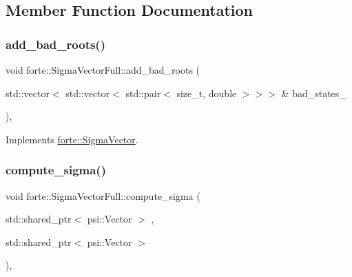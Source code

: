 \subsection{Member Function Documentation}
\mbox{\label{classforte_1_1_sigma_vector_full_a231cdb205bf558b4270daae212bd9dc6}} 
\subsubsection{\texorpdfstring{add\+\_\+bad\+\_\+roots()}{add\_bad\_roots()}}
{\footnotesize\ttfamily void forte\+::\+Sigma\+Vector\+Full\+::add\+\_\+bad\+\_\+roots (\begin{DoxyParamCaption}\item[{std\+::vector$<$ std\+::vector$<$ std\+::pair$<$ size\+\_\+t, double $>$$>$$>$ \&}]{bad\+\_\+states\+\_\+ }\end{DoxyParamCaption})\hspace{0.3cm}{\ttfamily [override]}, {\ttfamily [virtual]}}



Implements \mbox{\hyperlink{classforte_1_1_sigma_vector_a5cd950852f515bc082ca1df31bd84e3e}{forte\+::\+Sigma\+Vector}}.

\mbox{\label{classforte_1_1_sigma_vector_full_a23130725bbc872ce9e86340c3fff49e5}} 
\subsubsection{\texorpdfstring{compute\+\_\+sigma()}{compute\_sigma()}}
{\footnotesize\ttfamily void forte\+::\+Sigma\+Vector\+Full\+::compute\+\_\+sigma (\begin{DoxyParamCaption}\item[{std\+::shared\+\_\+ptr$<$ psi\+::\+Vector $>$}]{,  }\item[{std\+::shared\+\_\+ptr$<$ psi\+::\+Vector $>$}]{ }\end{DoxyParamCaption})\hspace{0.3cm}{\ttfamily [override]}, {\ttfamily [virtual]}}



